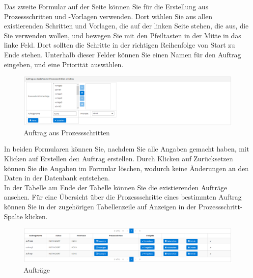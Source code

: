 \documentclass[enabledeprecatedfontcommands,fontsize=12pt,paper=a4,twoside]{scrartcl}
\begin{document}
Das zweite Formular auf der Seite können Sie für die Erstellung aus Prozessschritten und -Vorlagen verwenden. Dort wählen Sie aus allen existierenden Schritten und Vorlagen, die auf der linken Seite stehen, die aus, die Sie verwenden wollen, und bewegen Sie mit den Pfeiltasten in der Mitte in das linke Feld. Dort sollten die Schritte in der richtigen Reihenfolge von Start zu Ende stehen. Unterhalb dieser Felder können Sie einen Namen für den Auftrag eingeben, und eine Priorität auswählen. \\

\begin{figure}[h!]
\begin{center}
 \includegraphics[width=\textwidth]{screenshots/pk/auftragformular2.png}
  \caption{Auftrag aus Prozessschritten}
  \label{fig:boat2}
\end{center}
\end{figure}

In beiden Formularen können Sie, nachdem Sie alle Angaben gemacht haben, mit Klicken auf Erstellen den Auftrag erstellen. Durch Klicken auf Zurücksetzen können Sie die Angaben im Formular löschen, wodurch keine Änderungen an den Daten in der Datenbank entstehen. \\

In der Tabelle am Ende der Tabelle können Sie die existierenden Aufträge ansehen. Für eine Übersicht über die Prozessschritte eines bestimmten Auftrag können Sie in der zugehörigen Tabellenzeile auf Anzeigen in der Prozessschritt-Spalte klicken. \\

\begin{figure}[h!]
\begin{center}
 \includegraphics[width=\textwidth]{screenshots/pk/auftragliste.png}
  \caption{Aufträge}
  \label{fig:boat2}
\end{center}
\end{figure}
\end{document}
